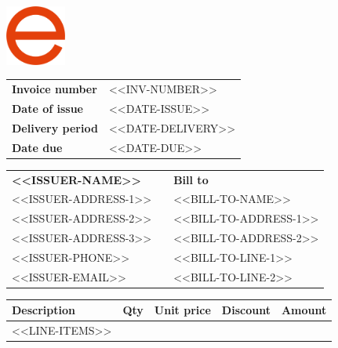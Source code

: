 \documentclass[letterpaper]{article}
\newcommand{\LARGER}{\fontsize{24}{24}\selectfont}
\begin{document}
	
\thispagestyle{empty}



\hfill{\includegraphics[height=1.98cm]{logo.png}}
\vspace{-1.98cm}

\textbf{\LARGER{Invoice}}
\vspace{20pt}

\renewcommand{\arraystretch}{1.2}

\begin{table}[h]
\begin{tabular}{@{}l l}
\textbf{Invoice number} & <<INV-NUMBER>> \\
\textbf{Date of issue}  & <<DATE-ISSUE>> \\ %
\textbf{Delivery period}& <<DATE-DELIVERY>> \\ %
\textbf{Date due}       & <<DATE-DUE>> %
\end{tabular}
\end{table}

\begin{table}[h]
\begin{tabularx}{\textwidth}{@{}l l l}
\textbf{<<ISSUER-NAME>>} && \textbf{Bill to}        \\
<<ISSUER-ADDRESS-1>>    && <<BILL-TO-NAME>>       \\
<<ISSUER-ADDRESS-2>>    && <<BILL-TO-ADDRESS-1>>  \\
<<ISSUER-ADDRESS-3>>    && <<BILL-TO-ADDRESS-2>>  \\
<<ISSUER-PHONE>>        && <<BILL-TO-LINE-1>>     \\
<<ISSUER-EMAIL>>        && <<BILL-TO-LINE-2>>
\end{tabularx}
\end{table}

\renewcommand{\arraystretch}{1.5}

\begin{table}[h]
\setlength{\tabcolsep}{12pt} %
\begin{tabularx}{\textwidth}{@{}X r r r r@{}}
   \textbf{Description} & \textbf{Qty} & \textbf{Unit price} & \textbf{Discount} & \textbf{Amount} \\[0.2em]
   \hline
   <<LINE-ITEMS>>
\end{tabularx}
\end{table}
\end{document}
